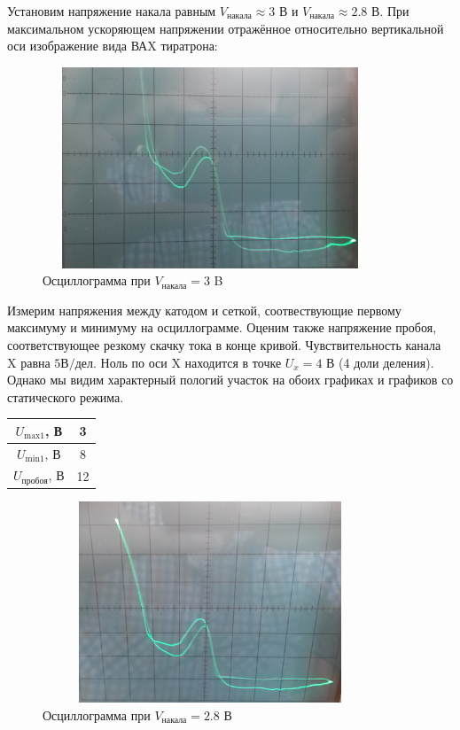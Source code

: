 \documentclass[12pt]{article}
\begin{document}
\par
	Установим напряжение накала равным $V_\text{накала} \approx 3	$ В и $V_\text{накала} \approx 2.8$ В. При максимальном ускоряющем напряжении отражённое относительно вертикальной оси изображение вида ВАX тиратрона:
\begin{figure}[h!]
	\centering
	\includegraphics[width = 10cm, height = 6cm]{imageplot1.png}
	\caption{Осциллограмма при $V_\text{накала} = 3$ B}
\end{figure}
\par
	Измерим напряжения между катодом и сеткой, соотвествующие первому максимуму и минимуму на осциллограмме. Оценим также напряжение пробоя, соответствующее резкому скачку тока в конце кривой. Чувствительность канала X равна $5 \text{В}/\text{дел}$. Ноль по оси X находится в точке $U_x = 4$ В (4 доли деления). Однако мы видим характерный пологий участок на обоих графиках и графиков со статического режима.
\newpage
\begin{table}[h!]
	\centering
	\begin{tabular}{|c|c|}
	\hline
		$U_\text{max1}$, В  & 3\\
	\hline
		$U_\text{min1}$, В & 8\\
	\hline
		$U_\text{пробоя}$, В & 12\\
	\hline
	\end{tabular}
\end{table}
\begin{figure}[h!]
	\centering
	\includegraphics[width = 10cm, height = 6cm]{imageplot2.png}
	\caption{Осциллограмма при $V_\text{накала} = 2.8$ В}
\end{figure}
\end{document}
